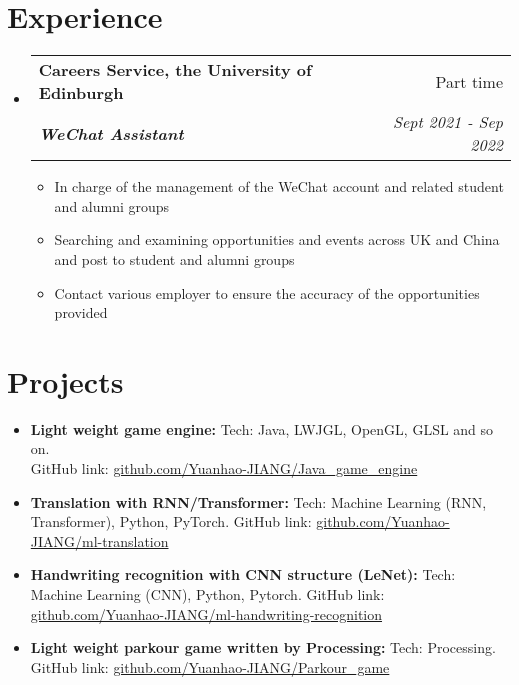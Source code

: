 \documentclass[12pt, a4paper]{article}
\makeatletter
\newcommand{\resumeSection}[1]{
    \section*{#1}
}
\newcommand{\resumeSectionItm}[4]{
\item
    \begin{tabular*}{0.96\textwidth}{@{}l@{\extracolsep{\fill}}r@{}}
        \textbf{#1} & #2 \\
        \textit{\textbf{#3}} & \textit{#4}
    \end{tabular*}
}
\newcommand{\resumeSectionSubItmI}[1]{
\item {#1}\vspace{-2mm}
}
\newcommand{\resumeSectionSubItmII}[2]{
\item \textbf{#1: }{#2}\vspace{-2mm}
}
\makeatother
\begin{document}
\resumeSection{Experience}
\begin{itemize}[leftmargin=*]
    \resumeSectionItm
    {Careers Service, the University of Edinburgh}{Part time}
    {WeChat Assistant}{Sept 2021 - Sep 2022}
    \vspace{-2mm}
    \begin{itemize}[leftmargin=*]
        \resumeSectionSubItmI{
            In charge of the management of the WeChat account and related
            student and alumni groups
        }
        \resumeSectionSubItmI{
            Searching and examining opportunities and events across UK and
            China and post to student and alumni groups
        }
        \resumeSectionSubItmI{
            Contact various employer to ensure the accuracy of the
            opportunities provided
        }
    \end{itemize}
\end{itemize}
\vspace{-2mm}

\resumeSection{Projects}
\vspace{1mm}
\begin{itemize}[leftmargin=*]
    \resumeSectionSubItmII{Light weight game engine}{Tech: Java, LWJGL,
        OpenGL, GLSL and so on.\\ GitHub link:
        \href{https://github.com/Yuanhao-JIANG/Java\_game\_engine}
        {github.com/Yuanhao-JIANG/Java\_game\_engine}}
    \resumeSectionSubItmII{Translation with RNN/Transformer}{Tech: Machine
        Learning (RNN, Transformer), Python, PyTorch. GitHub link:
        \href{https://github.com/Yuanhao-JIANG/ml-translation}
        {github.com/Yuanhao-JIANG/ml-translation}}
    \resumeSectionSubItmII{Handwriting recognition with CNN structure (LeNet)}
        {Tech: Machine Learning (CNN), Python, Pytorch. GitHub link:
        \href{https://github.com/Yuanhao-JIANG/ml-handwriting-recognition}
        {github.com/Yuanhao-JIANG/ml-handwriting-recognition}}
    \resumeSectionSubItmII{Light weight parkour game written by Processing}
        {Tech: Processing.\\ GitHub link:
        \href{https://github.com/Yuanhao-JIANG/Parkour_game}
        {github.com/Yuanhao-JIANG/Parkour\_game}}
\end{itemize}
\end{document}
